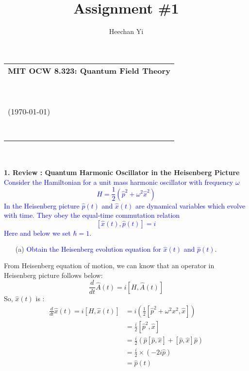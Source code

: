\documentclass[11pt, a4paper]{article}
\title{Assignment \#1}
\author{Heechan Yi}
\begin{document}
    \begin{tabularx}{\textwidth}{|X|}
	\hline
	\textsf{\bf MIT OCW 8.323: Quantum Field Theory \Romannum{1}} \hfill \\\
		
	\hfil {\LARGE \sf \@title \small{(\today)} } \hfil \\\

	{\hfill \@author} \\
        \hline
    \end{tabularx}
\\
\\
\textbf{1. Review : Quantum Harmonic Oscillator in the Heisenberg Picture}\\
\textcolor{blue}{
Consider the Hamiltonian for a unit mass harmonic oscillator with frequency $\omega$
\begin{equation}\label{eqn:1.1}
    H = \frac{1}{2} \left( \hat{p}^2 + \omega^2\hat{x}^2 \right)
\end{equation}
In the Heisenberg picture $\hat{p}(t)$ and $\hat{x}(t)$ are dynamical variables which evolve with time. They obey the equal-time commutation relation
\begin{equation}\label{eqn:1.2}
    [\hat{x}(t), \hat{p}(t)] = i
\end{equation}
Here and below we set $\hbar = 1$.
}
\begin{enumerate}
    \item [(a)] \textcolor{blue}{Obtain the Heisenberg evolution equation for $\hat{x}(t)$ and $\hat{p}(t)$.}
\end{enumerate}
From Heisenberg equation of motion, we can know that an operator in Heisenberg picture follows below:
$$
\frac{d}{dt}\hat{A}(t) = i[H, \hat{A}(t)]
$$
So, $\hat{x}(t)$ is :
\begin{align}
    \frac{d}{dt}\hat{x}(t) = i[H, \hat{x}(t)] & = i \left( \frac{1}{2} [\hat{p}^2+\omega^2 x^2, \hat{x}] \right) \\
    & = \frac{i}{2} [\hat{p}^2, \hat{x} ] \\
    & = \frac{i}{2} \left(  \hat{p}[\hat{p}, \hat{x}] + [\hat{p}, \hat{x}]\hat{p} \right) \\
    & = \frac{i}{2} \times (-2i\hat{p}) \\
    & = \hat{p}(t)
\end{align}
\end{document}
